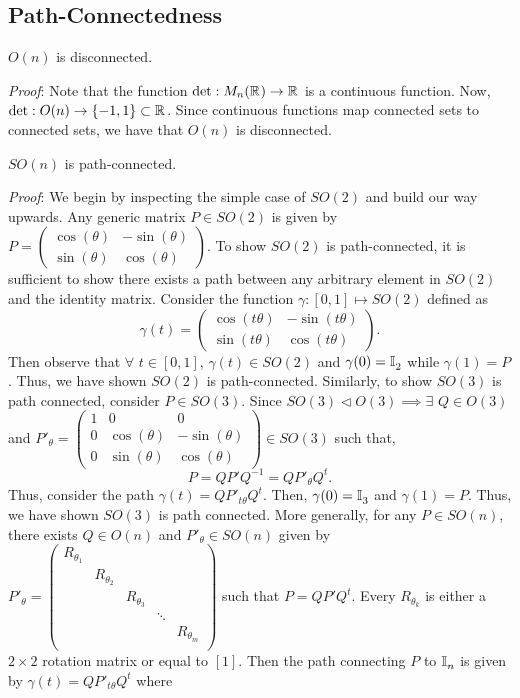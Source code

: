 \subsection{Path-Connectedness}
\begin{theorem}
$O(n)$ is disconnected.
\end{theorem}
\emph{Proof}: Note that the function $\mathrm{det}: M_n(\mathbb{R}^{}) \rightarrow \mathbb{R}^{}$ is a continuous function. Now, $\mathrm{det}: O(n) \rightarrow \{-1, 1\} \subset \mathbb{R}^{}$. Since continuous functions map connected sets to connected sets, we have that $O(n)$ is disconnected.
\begin{theorem}
$SO(n)$ is path-connected.
\end{theorem}
\emph{Proof}: We begin by inspecting the simple case of $SO(2)$ and build our way upwards. Any generic matrix $P \in SO(2)$ is given by $P = \begin{pmatrix}
\cos(\theta) & -\sin(\theta) \\
\sin(\theta) & \cos(\theta)
\end{pmatrix}$. To show $SO(2)$ is path-connected, it is sufficient to show there exists a path between any arbitrary element in $SO(2)$ and the identity matrix. Consider the function $\gamma: [0,1] \mapsto SO(2)$ defined as
$$\gamma(t) = \begin{pmatrix}
\cos(t\theta) & -\sin(t\theta) \\
\sin(t\theta) & \cos(t\theta)
\end{pmatrix}.$$
Then observe that $\forall$ $t \in [0,1]$, $\gamma(t) \in SO(2)$ and $\gamma(0) = \mathbb{I}^{}_2$ while $\gamma(1) = P$. Thus, we have shown $SO(2)$ is path-connected. Similarly, to show $SO(3)$ is path connected, consider $P \in SO(3).$ Since $SO(3) \lhd O(3) \implies \exists$ $Q \in O(3)$ and $P'_{\theta} = \begin{pmatrix}
1 & 0 & 0 \\
0 & \cos(\theta) & -\sin(\theta) \\
0 & \sin(\theta) & \cos(\theta)
\end{pmatrix} \in SO(3)$ such that, 
$$P = QP'Q^{-1} = QP'_{\theta}Q^{t}.$$ Thus, consider the path $\gamma(t) = QP'_{t\theta}Q^{t}$. Then, $\gamma(0) = \mathbb{I}^{}_3$ and $\gamma(1) = P$. Thus, we have shown $SO(3)$ is path connected. More generally, for any $P \in SO(n)$, there exists $Q \in O(n)$ and $P'_{\theta} \in SO(n)$ given by $P'_{\theta} = \begin{pmatrix}
R_{\theta_1} \\
& R_{\theta_2} \\
& & R_{\theta_3} \\
& & & \ddots \\ 
& & & & R_{\theta_m}\\ 
\end{pmatrix}$ such that $P = QP'Q^{t}$. Every $R_{\theta_k}$ is either a $2\times 2$ rotation matrix or equal to $[1]$. Then the path connecting $P$ to $\mathbb{I}^{}_n$ is given by $\gamma(t) = QP'_{t\theta}Q^{t}$ where 

